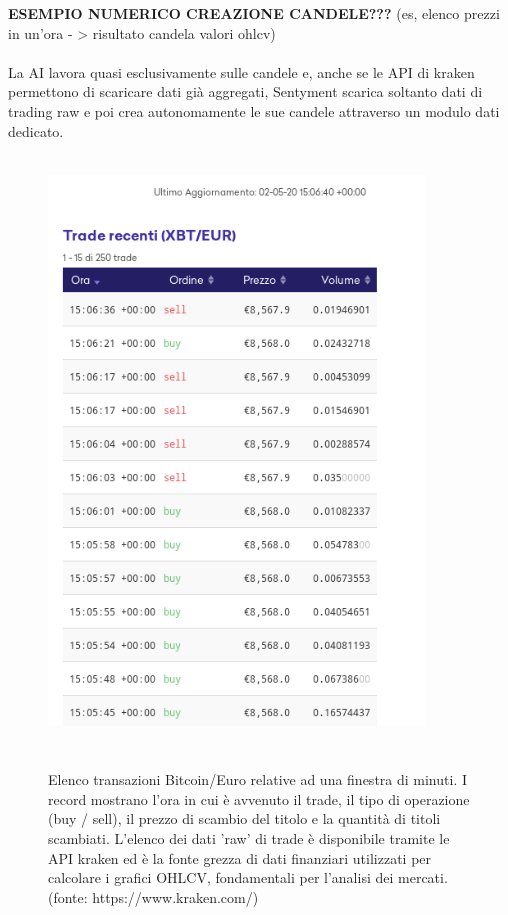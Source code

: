 \documentclass{article}
\numberwithin{equation}{section}
\begin{document}
		
		\textbf{ESEMPIO NUMERICO CREAZIONE CANDELE???}
		(es, elenco prezzi in un'ora - > risultato candela valori ohlcv)
		\\~\\
		
		La AI lavora quasi esclusivamente sulle candele e, anche se le API di kraken permettono di scaricare dati già aggregati, Sentyment scarica soltanto dati di trading raw e poi crea autonomamente le sue candele attraverso un modulo dati dedicato.
		\\~\\
		

		\begin{figure}
		\begin{center}
		\includegraphics[width=10cm]{kraken_raw}
		\caption{\\~\\Elenco transazioni Bitcoin/Euro relative ad una finestra di minuti. I record mostrano l'ora in cui è avvenuto il trade, il tipo di operazione (buy / sell), il prezzo di scambio del titolo e la quantità di titoli scambiati. L'elenco dei dati 'raw' di trade è disponibile tramite le API kraken ed è la fonte grezza di dati finanziari utilizzati per calcolare i grafici OHLCV, fondamentali per l'analisi dei mercati. (fonte: https://www.kraken.com/)}
		\end{center}
		\end{figure}
\end{document}
